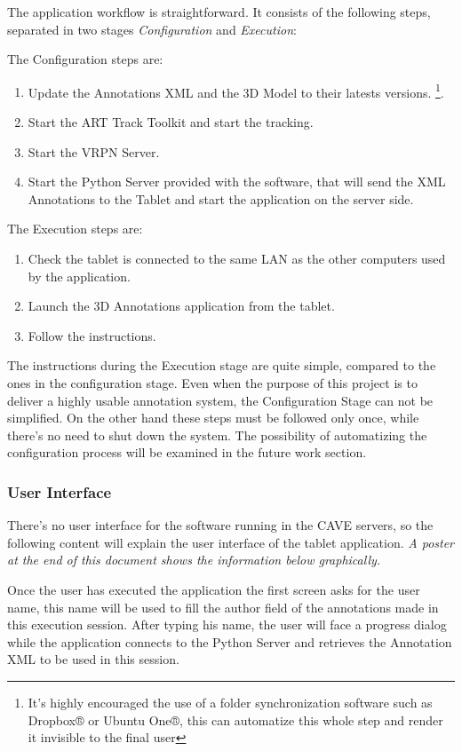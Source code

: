 The application workflow is straightforward. It consists of the following steps, separated in two stages \emph{Configuration} and \emph{Execution}:

The Configuration steps are:
\begin{enumerate}
\item Update the Annotations XML and the 3D Model to their latests versions. \footnote{It's highly encouraged the use of a folder synchronization software such as Dropbox® or Ubuntu One®, this can automatize this whole step and render it invisible to the final user}.
\item Start the ART Track Toolkit and start the tracking.
\item Start the VRPN Server.
\item Start the Python Server provided with the software, that will send the XML Annotations to the Tablet and start the application on the server side.
\end{enumerate}

The Execution steps are:
\begin{enumerate}
\item Check the tablet is connected to the same LAN as the other computers used by the application.
\item Launch the 3D Annotations application from the tablet.
\item Follow the instructions.
\end{enumerate}

The instructions during the Execution stage are quite simple, compared to the ones in the configuration stage. Even when the purpose of this project is to deliver a highly usable annotation system, the Configuration Stage can not be simplified. On the other hand these steps must be followed only once, while there's no need to shut down the system. The possibility of automatizing the configuration process will be examined in the future work section.

\subsubsection{User Interface}

There's no user interface for the software running in the CAVE servers, so the following content will explain the user interface of the tablet application. \emph{A poster at the end of this document shows the information below graphically.}

Once the user has executed the application the first screen asks for the user name, this name will be used to fill the author field of the annotations made in this execution session. After typing his name, the user will face a progress dialog while the application connects to the Python Server and retrieves the Annotation XML to be used in this session.


